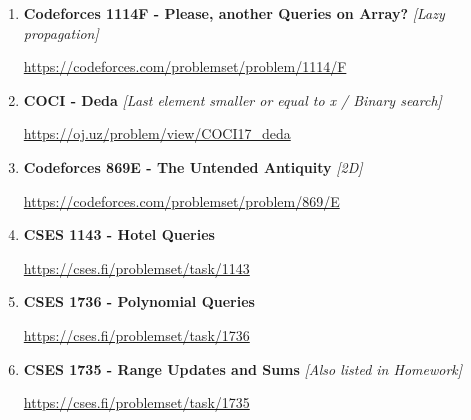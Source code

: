 \documentclass[11pt]{article}
\begin{document}
\begin{enumerate}
    \vspace{0.3em}
    {\small\url{https://codeforces.com/problemset/problem/242/E}}

    \vspace{0.8em}

    \item \textbf{Codeforces 1114F - Please, another Queries on Array?}
    \hfill \textit{[Lazy propagation]}

    \vspace{0.3em}
    {\small\url{https://codeforces.com/problemset/problem/1114/F}}

    \vspace{0.8em}

    \item \textbf{COCI - Deda}
    \hfill \textit{[Last element smaller or equal to x / Binary search]}

    \vspace{0.3em}
    {\small\url{https://oj.uz/problem/view/COCI17_deda}}

    \vspace{0.8em}

    \item \textbf{Codeforces 869E - The Untended Antiquity}
    \hfill \textit{[2D]}

    \vspace{0.3em}
    {\small\url{https://codeforces.com/problemset/problem/869/E}}

    \vspace{0.8em}

    \item \textbf{CSES 1143 - Hotel Queries}

    \vspace{0.3em}
    {\small\url{https://cses.fi/problemset/task/1143}}

    \vspace{0.8em}

    \item \textbf{CSES 1736 - Polynomial Queries}

    \vspace{0.3em}
    {\small\url{https://cses.fi/problemset/task/1736}}

    \vspace{0.8em}

    \item \textbf{CSES 1735 - Range Updates and Sums}
    \hfill \textit{[Also listed in Homework]}

    \vspace{0.3em}
    {\small\url{https://cses.fi/problemset/task/1735}}

\end{enumerate}
\end{document}
